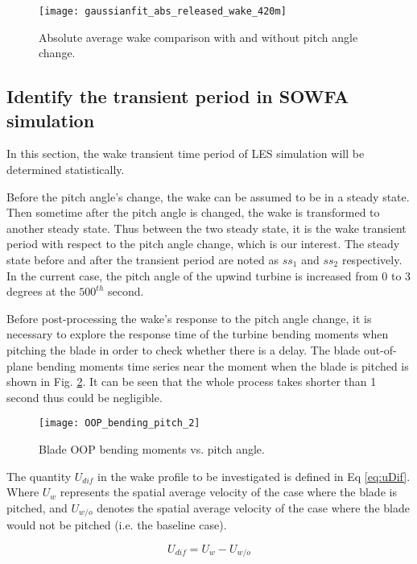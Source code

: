 \documentclass{umthesis}
\begin{document}
\begin{figure}
  \centering
  \texttt{[image: gaussianfit\_abs\_released\_wake\_420m]}
  \caption{Absolute average wake comparison with and without pitch angle change.}\label{fig:gaussianfit_abs_released_wake_420m}
\end{figure}

\subsection{Identify the transient period in SOWFA simulation}
In this section, the wake transient time period of LES simulation will be determined statistically. 

Before the pitch angle's change, the wake can be assumed to be in a steady state. Then sometime after the pitch angle is changed, the wake is transformed to another steady state. Thus between the two steady state, it is the wake transient period with respect to the pitch angle change, which is our interest. The steady state before and after the transient period are noted as $ss_1$ and $ss_2$ respectively. In the current case, the pitch angle of the upwind turbine is increased from 0 to 3 degrees at the $500^{th}$ second.

Before post-processing the wake's response to the pitch angle change, it is necessary to explore the response time of the turbine bending moments when pitching the blade in order to check whether there is a delay. The blade out-of-plane bending moments time series near the moment when the blade is pitched is shown in Fig. \ref{fig:OOP_bending_pitch_2}. It can be seen that the whole process takes shorter than 1 second thus could be negligible. 

\begin{figure}
  \centering
  \texttt{[image: OOP\_bending\_pitch\_2]}
  \caption{Blade OOP bending moments vs. pitch angle.}\label{fig:OOP_bending_pitch_2}
\end{figure}
 

The quantity $U_{dif}$ in the wake profile to be investigated is defined in Eq \ref{eq:uDif}. Where $U_{w}$ represents the spatial average velocity of the case where the blade is pitched, and $U_{w/o}$ denotes the spatial average velocity of the case where the blade would not be pitched (i.e. the baseline case). 

\begin{equation}\label{eq:uDif}
  U_{dif} = U_{w} - U_{w/o}
\end{equation}
\end{document}
